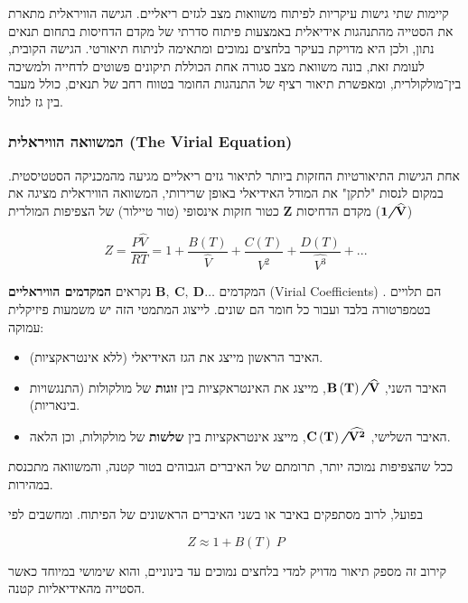\documentclass[
  hebrew,
  letterpaper,
  DIV=11,
  numbers=noendperiod]{scrreprt}
\begin{document}
קיימות שתי גישות עיקריות לפיתוח משוואות מצב לגזים ריאליים. הגישה
הוויראלית מתארת את הסטייה מהתנהגות אידיאלית באמצעות פיתוח סדרתי של מקדם
הדחיסות בתחום תנאים נתון, ולכן היא מדויקת בעיקר בלחצים נמוכים ומתאימה
לניתוח תיאורטי. הגישה הקובית, לעומת זאת, בונה משוואת מצב סגורה אחת
הכוללת תיקונים פשוטים לדחייה ולמשיכה בין־מולקולרית, ומאפשרת תיאור רציף
של התנהגות החומר בטווח רחב של תנאים, כולל מעבר בין גז לנוזל.

\subsubsection{המשוואה הוויראלית (The Virial
Equation)}\label{ux5d4ux5deux5e9ux5d5ux5d5ux5d0ux5d4-ux5d4ux5d5ux5d5ux5d9ux5e8ux5d0ux5dcux5d9ux5ea-the-virial-equation}

אחת הגישות התיאורטיות החזקות ביותר לתיאור גזים ריאליים מגיעה מהמכניקה
הסטטיסטית. במקום לנסות "לתקן" את המודל האידיאלי באופן שרירותי, המשוואה
הוויראלית מציגה את מקדם הדחיסות \(\mathbf{Z}\) כטור חזקות אינסופי (טור
טיילור) של הצפיפות המולרית
(\(\mathbf{1}\textit{\textbf{/}}\widehat{\mathbf{V}}\))

\[Z = \frac{P\widehat{V}}{RT} = 1 + \frac{B(T)}{\widehat{V}} + \frac{C(T)}{\widehat{V^{2}}} + \frac{D(T)}{\widehat{V^{3}}} + ...\]

המקדמים \(\mathbf{B,\ C,\ D\ldots}\) נקראים \textbf{המקדמים הוויראליים}
(Virial Coefficients) . הם תלויים בטמפרטורה בלבד ועבור כל חומר הם שונים.
לייצוג המתמטי הזה יש משמעות פיזיקלית עמוקה:

\begin{itemize}
\item
  האיבר הראשון מייצג את הגז האידיאלי (ללא אינטראקציות).
\item
  האיבר השני,
  \(\mathbf{B}\left( \mathbf{T} \right)\textit{\textbf{/}}\widehat{\mathbf{V}}\),
  מייצג את האינטראקציות בין \textbf{זוגות} של מולקולות (התנגשויות
  בינאריות).
\item
  האיבר השלישי,
  \(\mathbf{C}\left( \mathbf{T} \right)\textit{\textbf{/}}\widehat{\mathbf{V}^{\mathbf{2}}}\),
  מייצג אינטראקציות בין \textbf{שלשות} של מולקולות, וכן הלאה.
\end{itemize}

ככל שהצפיפות נמוכה יותר, תרומתם של האיברים הגבוהים בטור קטנה, והמשוואה
מתכנסת במהירות.

בפועל, לרוב מסתפקים באיבר או בשני האיברים הראשונים של הפיתוח. ומחשבים
לפי

\[Z \approx 1 + B(T)\text{ }P\]

קירוב זה מספק תיאור מדויק למדי בלחצים נמוכים עד בינוניים, והוא שימושי
במיוחד כאשר הסטייה מהאידיאליות קטנה.
\end{document}
